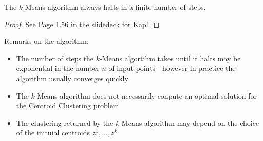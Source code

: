 \begin{theorem}{}
The $k$-Means algorithm always halts in a finite number of steps.
\end{theorem}
\begin{proof}{}
	See Page 1.56 in the slidedeck for Kap1
\end{proof}

Remarks on the algorithm:
\begin{itemize}
	\item{The number of steps the $k$-Means algortihm takes until it halts may be exponential in the number $n$ of input points - however in practice the algorithm usually converges quickly}
	\item{The $k$-Means algorithm does not necessarily conpute an optimal solution for the Centroid Clustering problem}
	\item{The clustering returned by the $k$-Means algorithm may depend on the choice of the inituial centroids $z^1,...,z^k$}
\end{itemize}